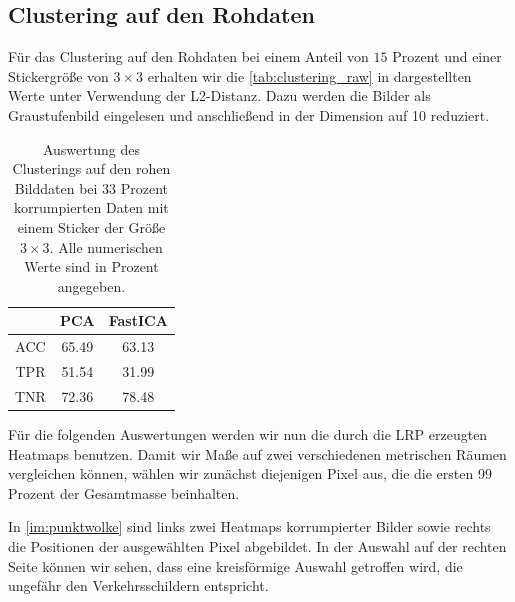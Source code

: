 \documentclass[11pt,a4paper]{article}
\numberwithin{equation}{section}
\begin{document}
	\subsection{Clustering auf den Rohdaten}
	Für das Clustering auf den Rohdaten bei einem Anteil von $15$ Prozent und einer Stickergröße von $3 \times 3$ erhalten wir die \autoref{tab:clustering_raw} in dargestellten Werte unter Verwendung der L2-Distanz. Dazu werden die Bilder als Graustufenbild eingelesen und anschließend in der Dimension auf 10 reduziert.
	\begin{table}[ht]
		\begin{center}
				\begin{tabular}{c|c|c}
					& PCA & FastICA \\ \hline
					ACC	 & 	65.49 & 63.13 \\
					TPR		& 51.54 & 31.99 \\
					TNR	& 72.36 	&78.48 	 
				\end{tabular}
				\caption[Auswertung des Clusterings auf den rohen Bilddaten]{Auswertung des Clusterings auf den rohen Bilddaten bei 33 Prozent korrumpierten Daten mit einem Sticker der Größe $3 \times 3$. Alle numerischen Werte sind in Prozent angegeben.}	
				\label{tab:clustering_raw}
			
			
		\end{center}
	\end{table}
	
	Für die folgenden Auswertungen werden wir nun die durch die LRP erzeugten Heatmaps benutzen. Damit wir Maße auf zwei verschiedenen metrischen Räumen vergleichen können, wählen wir zunächst diejenigen Pixel aus, die die ersten 99 Prozent der Gesamtmasse beinhalten.
	
	In \autoref{im:punktwolke} sind links zwei Heatmaps korrumpierter Bilder sowie rechts die Positionen der ausgewählten Pixel abgebildet. In der Auswahl auf der rechten Seite können wir sehen, dass eine kreisförmige Auswahl getroffen wird, die ungefähr den Verkehrsschildern entspricht.
	
\end{document}
